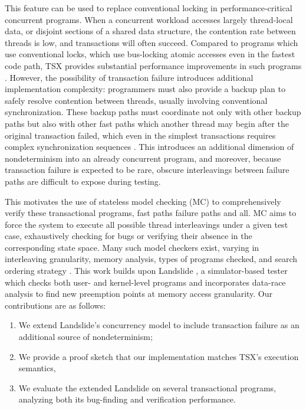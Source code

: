 \documentclass[10pt]{sigplanconf}
\begin{document}
This feature can be used to replace conventional locking in performance-critical concurrent programs.
When a concurrent workload accesses largely thread-local data,
or disjoint sections of a shared data structure,
the contention rate between threads is low,
and transactions will often succeed.
Compared to programs which use conventional locks,
which use bus-locking atomic accesses even in the fastest code path,
TSX provides substantial performance improvements in such programs \cite{htm-experience, htm-performance, htm-mario}.
However, the possibility of transaction failure introduces additional implementation complexity:
programmers must also provide a backup plan
to safely resolve contention between threads,
usually involving conventional synchronization.
These backup paths must coordinate not only with other backup paths
but also with other fast paths which another thread may begin after the original transaction failed,
which even in the simplest transactions requires complex synchronization sequences
\cite{htm-mario}.
This introduces an additional dimension of nondeterminism into an already concurrent program,
and moreover, because transaction failure is expected to be rare,
obscure interleavings between failure paths are difficult to expose during testing.

This motivates the use of stateless model checking (MC) \cite{verisoft}
to comprehensively verify these transactional programs,
fast paths failure paths and all.
MC aims to force the system to execute all possible thread interleavings under a given test case,
exhaustively checking for bugs or verifying their absence in the corresponding state space.
Many such model checkers exist, varying in
interleaving granularity, memory analysis, types of programs checked, and search ordering strategy
\cite{chess,dbug-ssv,spin,inspect,r4,portend,samc,mcr,randomized-scheduler}.
This work builds upon Landslide \cite{landslide}, %
a simulator-based tester which checks both user- and kernel-level programs
and incorporates data-race analysis \cite{tsan,fasttrack} to find new preemption points
at memory access granularity.
Our contributions are as follows:

\begin{enumerate}
	\item We extend Landslide's concurrency model to include transaction failure as an additional source of nondeterminism;
	\item We provide a proof sketch that our implementation matches TSX's execution semantics,
	\item We evaluate the extended Landslide on several transactional programs, analyzing both its bug-finding and verification performance.
\end{enumerate}
\end{document}
